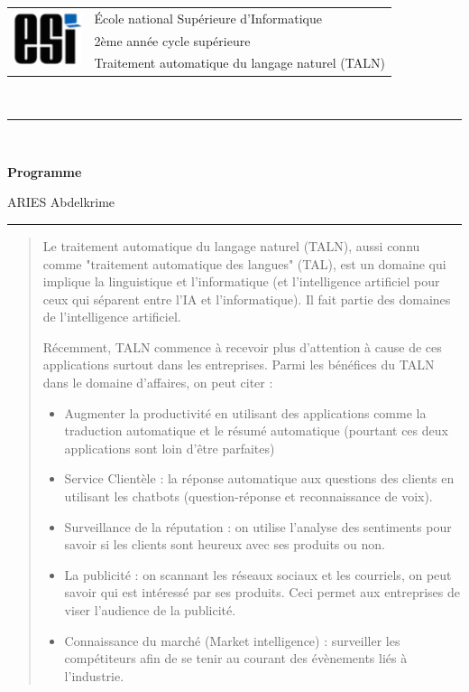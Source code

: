 \documentclass[11pt, a4paper]{article}
\begin{document}
\pagestyle{fancy}

\noindent
\begin{tabular}{ll}
\multirow{3}{*}{\includegraphics[width=2cm]{esi-logo.png}} & \'Ecole national Supérieure d'Informatique\\
& 2ème année cycle supérieure\\
& Traitement automatique du langage naturel (TALN)
\end{tabular}\\[.25cm]
\noindent\rule{\textwidth}{1pt}\\%
\begin{center}
{\LARGE \textbf{Programme}}
\begin{flushright}
	ARIES Abdelkrime
\end{flushright}
\end{center}
\noindent\rule{\textwidth}{1pt}

\begin{abstract}
	Le traitement automatique du langage naturel (TALN), aussi connu comme "traitement automatique des langues" (TAL), est un domaine qui implique la linguistique et l'informatique (et l'intelligence artificiel pour ceux qui séparent entre l'IA et l'informatique). Il fait partie des domaines de l'intelligence artificiel.
	
	Récemment, TALN commence à recevoir plus d'attention à cause de ces applications surtout dans les entreprises. Parmi les bénéfices du TALN dans le domaine d'affaires, on peut citer : 
	\begin{itemize}
		\item Augmenter la productivité en utilisant des applications comme la traduction automatique et le résumé automatique (pourtant ces deux applications sont loin d'être parfaites)
		\item Service Clientèle : la réponse automatique aux questions des clients en utilisant les chatbots (question-réponse et reconnaissance de voix). 
		\item Surveillance de la réputation : on utilise l'analyse des sentiments pour savoir si les clients sont heureux avec ses produits ou non. 
		\item La publicité : on scannant les réseaux sociaux et les courriels, on peut savoir qui est intéressé par ses produits. Ceci permet aux entreprises de viser l'audience de la publicité. 
		\item Connaissance du marché (Market intelligence) : surveiller les compétiteurs afin de se tenir au courant des évènements liés à l'industrie.
		
	\end{itemize}
\end{abstract}
\end{document}
